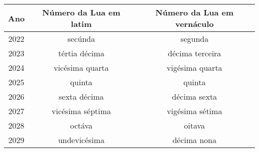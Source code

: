 \label{appendix:kalenda}
\begin{center}
  \begin{tabular}{|c|c|c|}
    \hline
    Ano  & Número da Lua em latim & Número da Lua em vernáculo \\
    \hline
    \hline
    2022 & secúnda                & segunda                    \\
    2023 & tértia décima          & décima terceira            \\
    2024 & vicésima quarta        & vigésima quarta            \\
    2025 & quinta                 & quinta                     \\
    2026 & sexta décima           & décima sexta               \\
    2027 & vicésima séptima       & vigésima sétima            \\
    2028 & octáva                 & oitava                     \\
    2029 & undevicésima           & décima nona                \\
    \hline
    \hline
  \end{tabular}
\end{center}

\label{appendix:te-deum}

\label{appendix:veni-creator-spiritus}
